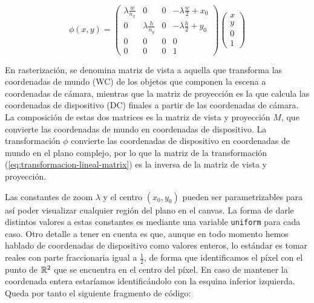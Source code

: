 \begin{equation}
    \label{eq:transformacion-lineal-matrix}
    \phi(x,y)=\left(\begin{array}{ccc|c}
        \lambda\frac{w}{n_x} & 0 & 0 & -\lambda\frac{w}{2}+x_0 \\

        0 & \lambda\frac{h}{n_y} & 0 & -\lambda\frac{h}{2}+y_0 \\
        0 & 0 & 0 & 0 \\ \hline
        0 & 0 & 0 & 1
    \end{array}\right)\left(
    \begin{array}{c}
        x \\ y \\ 0 \\ \hline 1
    \end{array}\right)
\end{equation}

En rasterización, se denomina matriz de vista a aquella que transforma las coordenadas de mundo (WC) de los objetos que componen la escena a coordenadas de cámara, mientras que la matriz de proyección es la que calcula las coordenadas de dispositivo (DC) finales a partir de las coordenadas de cámara. La composición de estas dos matrices es la matriz de vista y proyección $M$, que convierte las coordenadas de mundo en coordenadas de dispositivo. La transformación $\phi$ convierte las coordenadas de dispositivo en coordenadas de mundo en el plano complejo, por lo que la matriz de la transformación (\ref{eq:transformacion-lineal-matrix}) es la inversa de la matriz de vista y proyección.


Las constantes de zoom $\lambda$ y el centro $(x_0,y_0)$ pueden ser parametrizables para así poder visualizar cualquier región del plano en el canvas. La forma de darle distintos valores a estas constantes es mediante una variable \verb|uniform| para cada caso. Otro detalle a tener en cuenta es que, aunque en todo momento hemos hablado de coordenadas de dispositivo como valores enteros, lo estándar es tomar reales con parte fraccionaria igual a $\frac{1}{2}$, de forma que identificamos el píxel con el punto de $\mathbb{R}^2$ que se encuentra en el centro del píxel. En caso de mantener la coordenada entera estaríamos identificándolo con la esquina inferior izquierda. Queda por tanto el siguiente fragmento de código:

